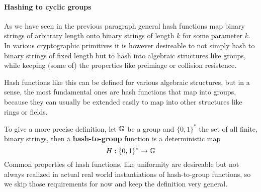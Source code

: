\paragraph{Hashing to cyclic groups} As we have seen in the previous paragraph general hash functions map binary strings of arbitrary length onto binary strings of length $k$ for some parameter $k$. In various cryptographic primitives it is however desireable to not simply hash to binary strings of fixed length but to hash into algebraic structures like groups, while keeping (some of) the properties like preimiage or collision resistence. 

Hash functions like this can be defined for various algebraic structures, but in a sense, the most fundamental ones are hash functions that map into groups, because they can usually be extended easily to map into other structures like rings or fields. 

To give a more precise definition, let $\mathbb{G}$ be a group and $\{0,1\}^*$ the set of all finite, binary strings, then a \textbf{hash-to-group} function is a deterministic map
\begin{equation}
H : \{0,1\}^* \to \mathbb{G}
\end{equation}
Common properties of hash functions, like uniformity are desireable but not always realized in actual real world instantiations of hash-to-group functions, so we skip those requirements for now and keep the definition very general.

